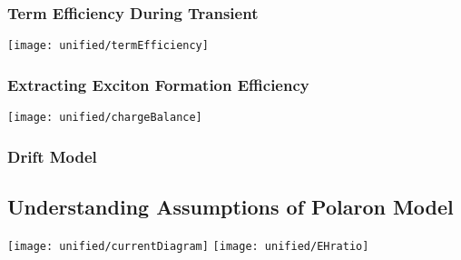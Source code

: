 \documentclass[../thesis.tex]{subfiles}
\begin{document}
\subsubsection{Term Efficiency During Transient}
\texttt{[image: unified/termEfficiency]}
\subsubsection{Extracting Exciton Formation Efficiency}
\texttt{[image: unified/chargeBalance]}
\subsubsection{Drift Model}
\subsection{Understanding Assumptions of Polaron Model}
\texttt{[image: unified/currentDiagram]}
\texttt{[image: unified/EHratio]}
\end{document}
